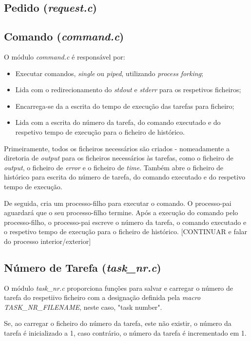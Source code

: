 \documentclass[a4paper,11pt]{scrreprt}
\begin{document}
        \subsection{Pedido (\textit{request.c})}

        \subsection{Comando (\textit{command.c})}
        O módulo \textit{command.c} é responsável por:
        \begin{itemize}
            \item Executar comandos, \textit{single} ou \textit{piped}, utilizando \textit{process forking};
            \item Lida com o redirecionamento do \textit{stdout} e \textit{stderr} para os respetivos ficheiros;
            \item Encarrega-se da a escrita do tempo de execução das tarefas para ficheiro;
            \item Lida com a escrita do número da tarefa, do comando executado e do respetivo tempo de execução para o ficheiro de histórico.
        \end{itemize}

        Primeiramente, todos os ficheiros necessários são criados - nomeadamente a diretoria de \textit{output} para os ficheiros necessários às tarefas, como o ficheiro de \textit{output}, o ficheiro de \textit{error} e o ficheiro de \textit{time}. Também abre o ficheiro de histórico para escrita do número de  tarefa, do comando executado e do respetivo tempo de execução.

        De seguida, cria um processo-filho para executar o comando. O processo-pai aguardará que o seu processo-filho termine. Após a execução do comando pelo processo-filho, o processo-pai escreve o número da tarefa, o comando executado e o respetivo tempo de execução para o ficheiro de histórico. [CONTINUAR e falar do processo interior/exterior]

        \subsection{Número de Tarefa (\textit{task\_nr.c})}
        O módulo \textit{task\_nr.c} proporciona funções para salvar e carregar o número de tarefa do respetiivo ficheiro com a designação definida pela \textit{macro TASK\_NR\_FILENAME}, neste caso, "task number".

        Se, ao carregar o ficheiro do número da tarefa, este não existir, o número da tarefa é inicializado a 1, caso contrário, o número da tarefa é incrementado em 1.
\end{document}

